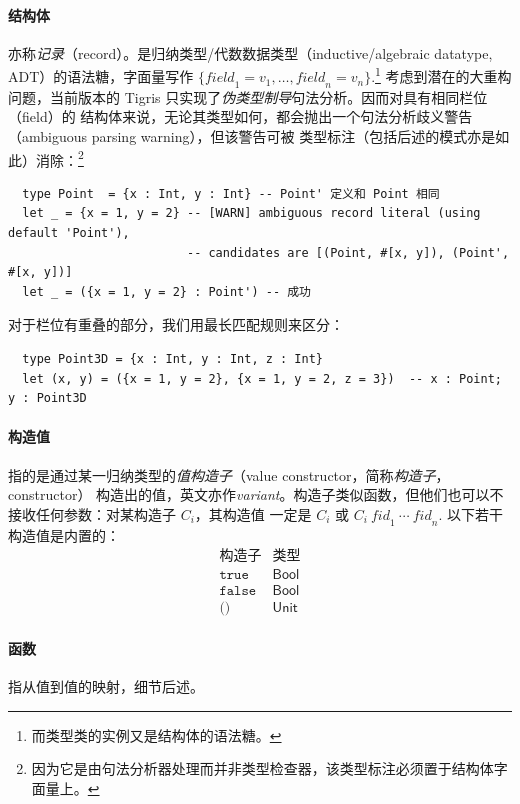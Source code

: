 \documentclass[a4paper, 11pt]{article}
\theoremstyle{remark}\newtheorem*{remark}{Remark}
\theoremstyle{definition}\newtheorem*{definition}{Definition}
\begin{document}
\paragraph*{结构体} 亦称\emph{记录}（record）。是归纳类型/代数数据类型（inductive/algebraic datatype, ADT）的语法糖，字面量写作
\(\{\textit{field}_1 = v_1,\dots,\textit{field}_n=v_n\}\).\footnote{而类型类的实例又是结构体的语法糖。}
考虑到潜在的大重构问题，当前版本的 Tigris 只实现了\emph{伪类型制导}句法分析。因而对具有相同栏位（field）的
结构体来说，无论其类型如何，都会抛出一个句法分析歧义警告（ambiguous parsing warning），但该警告可被
类型标注（包括后述的模式亦是如此）消除：\footnote{
  因为它是由句法分析器处理而并非类型检查器，该类型标注必须置于结构体字面量上。
}
\begin{verbatim}
  type Point  = {x : Int, y : Int} -- Point' 定义和 Point 相同
  let _ = {x = 1, y = 2} -- [WARN] ambiguous record literal (using default 'Point'),
                         -- candidates are [(Point, #[x, y]), (Point', #[x, y])]
  let _ = ({x = 1, y = 2} : Point') -- 成功
\end{verbatim}
对于栏位有重叠的部分，我们用最长匹配规则来区分：
\begin{verbatim}
  type Point3D = {x : Int, y : Int, z : Int}
  let (x, y) = ({x = 1, y = 2}, {x = 1, y = 2, z = 3})  -- x : Point; y : Point3D
\end{verbatim}
\paragraph*{构造值} 指的是通过某一归纳类型的\emph{值构造子}（value constructor，简称\emph{构造子}，constructor）
构造出的值，英文亦作\emph{variant}。构造子类似函数，但他们也可以不接收任何参数：对某构造子 $C_i$，其构造值
一定是 $C_i$ 或 $C_i\ \textit{fid}_1\ \cdots\ \textit{fid}_n$. 以下若干构造值是内置的：
\[
  \begin{matrix}
    \textbf{构造子}       & \textbf{类型} \\
    \texttt{true}         & \mathsf{Bool}  \\
    \texttt{false}        & \mathsf{Bool}  \\
    \texttt{()}           & \mathsf{Unit}
  \end{matrix}
\]
\paragraph*{函数} 指从值到值的映射，细节后述。
\end{document}
